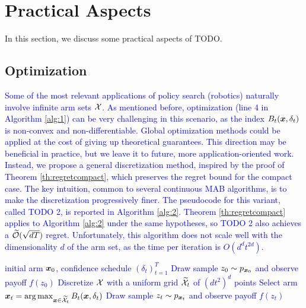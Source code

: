 \documentclass{article}
\makeatletter
\DeclareRobustCommand{\algoname}{TODO\@\xspace}
\makeatother
\begin{document}
\section{Practical Aspects}\label{sec:practical}
In this section, we discuss some practical aspects of \algoname. 

\subsection{Optimization}
\textcolor{blue}{
Some of the most relevant applications of policy search (\eg robotics) naturally involve infinite arm sets $\mathcal{X}$. As mentioned before, optimization (line 4 in Algorithm \ref{alg:1}) can be very challenging in this scenario, as the index $B_t(\boldsymbol{x},\delta_t)$ is non-convex and non-differentiable. Global optimization methods could be applied at the cost of giving up theoretical guarantees. This direction may be beneficial in practice, but we leave it to future, more application-oriented work. Instead, we propose a general discretization method, inspired by the proof of Theorem \ref{th:regretcompact}, which preserves the regret bound for the compact case. The key intuition, common to several continuous MAB algorithms, is to make the discretization progressively finer. The pseudocode for this variant, called \algoname2, is reported in Algorithm \ref{alg:2}. Theorem \ref{th:regretcompact} applies to Algorithm \ref{alg:2} under the same hypotheses, so \algoname2 also achieves a $\widetilde{\mathcal{O}}(\sqrt{dT})$ regret. Unfortunately, this algorithm does not scale well with the dimensionality $d$ of the arm set, as the time per iteration is $O(d^dt^{2d})$.
%
\begin{algorithm}[t]
	\caption{\algoname2}
	\label{alg:2}
	\begin{algorithmic}[1]
		 initial arm $\boldsymbol{x}_0$, confidence schedule $(\delta_t)_{t=1}^T$
		\STATE Draw sample $z_0\sim p_{\boldsymbol{x}_0}$ and observe payoff $f(z_0)$
		\STATE Discretize $\mathcal{X}$ with a uniform grid $\widetilde{\mathcal{X}}_t$ of $(dt^2)^d$ points
		\STATE Select arm $\boldsymbol{x}_t = \arg\max_{\boldsymbol{x}\in\widetilde{\mathcal{X}}_t}B_t(\boldsymbol{x},\delta_t)$
		\STATE Draw sample $z_t\sim p_{\boldsymbol{x}_t}$ and observe payoff $f(z_t)$
		\ENDFOR
	\end{algorithmic}
\end{algorithm}
%
}
\end{document}

